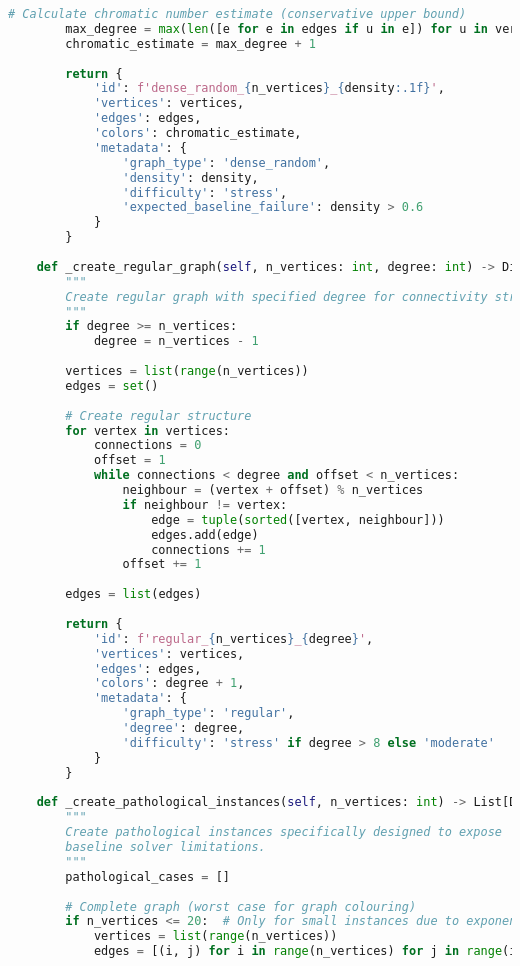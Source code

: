 \begin{lstlisting}[language=Python, caption=Stress Testing Framework for Worst-Case Validation]
        # Calculate chromatic number estimate (conservative upper bound)
        max_degree = max(len([e for e in edges if u in e]) for u in vertices)
        chromatic_estimate = max_degree + 1
        
        return {
            'id': f'dense_random_{n_vertices}_{density:.1f}',
            'vertices': vertices,
            'edges': edges,
            'colors': chromatic_estimate,
            'metadata': {
                'graph_type': 'dense_random',
                'density': density,
                'difficulty': 'stress',
                'expected_baseline_failure': density > 0.6
            }
        }
    
    def _create_regular_graph(self, n_vertices: int, degree: int) -> Dict:
        """
        Create regular graph with specified degree for connectivity stress testing.
        """
        if degree >= n_vertices:
            degree = n_vertices - 1
        
        vertices = list(range(n_vertices))
        edges = set()
        
        # Create regular structure
        for vertex in vertices:
            connections = 0
            offset = 1
            while connections < degree and offset < n_vertices:
                neighbour = (vertex + offset) % n_vertices
                if neighbour != vertex:
                    edge = tuple(sorted([vertex, neighbour]))
                    edges.add(edge)
                    connections += 1
                offset += 1
        
        edges = list(edges)
        
        return {
            'id': f'regular_{n_vertices}_{degree}',
            'vertices': vertices,
            'edges': edges,
            'colors': degree + 1,
            'metadata': {
                'graph_type': 'regular',
                'degree': degree,
                'difficulty': 'stress' if degree > 8 else 'moderate'
            }
        }
    
    def _create_pathological_instances(self, n_vertices: int) -> List[Dict]:
        """
        Create pathological instances specifically designed to expose 
        baseline solver limitations.
        """
        pathological_cases = []
        
        # Complete graph (worst case for graph colouring)
        if n_vertices <= 20:  # Only for small instances due to exponential growth
            vertices = list(range(n_vertices))
            edges = [(i, j) for i in range(n_vertices) for j in range(i + 1, n_vertices)]
            

\end{lstlisting}
